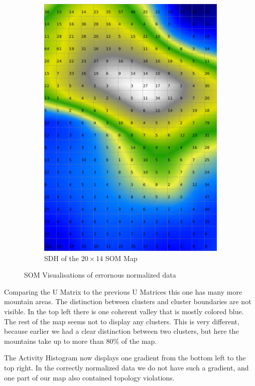 \documentclass{acm_proc_article-sp}
\begin{document}
\begin{figure}
\begin{subfigure}[b]{0.45\linewidth}
        \includegraphics[width=\linewidth]{img/wine-weird-smoothed-data-histogram}
        \caption{SDH of the $20\times14$ SOM Map}
        \label{fig:wine-weird-smoothed-data-histogram}
    \end{subfigure}
    \caption{SOM Visualisations of errornous normalized data}
\end{figure}

Comparing the U Matrix to the previous U Matrices this one has many more mountain
areas. The distinction between clusters and cluster boundaries are not visible.
In the top left there is one coherent valley that is mostly colored blue.
The rest of the map seems not to display any clusters. This is very different, because
earlier we had a clear distinction between two clusters, but here the mountains
take up to more than 80\% of the map.

The Activity Histogram now displays one gradient from the bottom left to the top right.
In the correctly normalized data we do not have such a gradient, and one part of our map
also contained topology violations.
\end{document}
